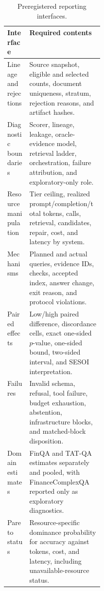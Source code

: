 \begin{table}[H]
\centering
\scriptsize
\caption{Preregistered reporting interfaces.}
\label{tab:interfaces}
\begin{tabularx}{\linewidth}{@{}p{0.23\linewidth}Y@{}}
\toprule
Interface & Required contents \\
\midrule
Lineage and rejections & Source snapshot, eligible and selected counts,
document uniqueness, stratum, rejection reasons, and artifact hashes. \\
Diagnostic boundaries & Scorer, lineage, leakage, oracle-evidence model,
retrieval ladder, orchestration, failure attribution, and exploratory-only role. \\
Resource manipulation & Tier ceiling, realized prompt/completion/total tokens,
calls, retrieval, candidates, repair, cost, and latency by system. \\
Mechanisms & Planned and actual queries, evidence IDs, checks, accepted index,
answer change, exit reason, and protocol violations. \\
Paired effects & Low/high paired difference, discordance cells, exact one-sided
$p$-value, one-sided bound, two-sided interval, and SESOI interpretation. \\
Failures & Invalid schema, refusal, tool failure, budget exhaustion, abstention,
infrastructure blocks, and matched-block disposition. \\
Domain estimates & FinQA and TAT-QA estimates separately and pooled, with
FinanceComplexQA reported only as exploratory diagnostics. \\
Pareto status & Resource-specific dominance probability for accuracy against
tokens, cost, and latency, including unavailable-resource status. \\
\bottomrule
\end{tabularx}
\end{table}
